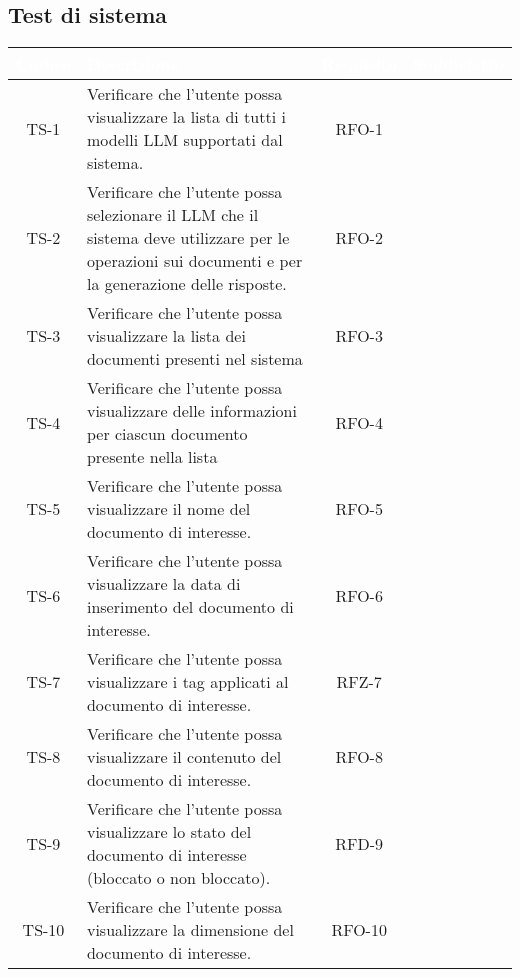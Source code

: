 \newpage
\subsection{Test di sistema}

\begingroup
\setlength{\tabcolsep}{10pt}
\renewcommand{\arraystretch}{1.5}
\begin{xltabular}{\textwidth}{| c | X | c | c |}
    \hline
     \textbf{\textcolor{white}{Codice}} & \textbf{\textcolor{white}{Descrizione}} & \textbf{\textcolor{white}{Requisito}} & \textbf{\textcolor{white}{Soddisfatto}}\\
    \hline
    \endhead
    TS-1 & Verificare che l’utente possa visualizzare la lista di tutti i modelli LLM supportati dal sistema. & RFO-1 & \textcolor{cmarkcolor}{} \\
    \hline
    TS-2 & Verificare che l’utente possa selezionare il LLM che il sistema deve utilizzare per le operazioni sui documenti e per la generazione delle risposte. & RFO-2 & \textcolor{cmarkcolor}{} \\
    \hline
    TS-3 & Verificare che l'utente possa visualizzare la lista dei documenti presenti nel sistema & RFO-3 & \textcolor{cmarkcolor}{} \\
    \hline
    TS-4 & Verificare che l'utente possa visualizzare delle informazioni per ciascun documento presente nella lista & RFO-4 & \textcolor{cmarkcolor}{} \\
    \hline
    TS-5 & Verificare che l’utente possa visualizzare il nome del documento di interesse. & RFO-5 & \textcolor{cmarkcolor}{} \\
    \hline
    TS-6 & Verificare che l’utente possa visualizzare la data di inserimento del documento di interesse. & RFO-6 & \textcolor{cmarkcolor}{} \\
    \hline
    TS-7 & Verificare che l’utente possa visualizzare i tag applicati al documento di interesse. & RFZ-7 & \textcolor{cmarkcolor}{} \\
    \hline
    TS-8 & Verificare che l’utente possa visualizzare il contenuto del documento di interesse. & RFO-8 & \textcolor{cmarkcolor}{} \\
    \hline
    TS-9 & Verificare che l’utente possa visualizzare lo stato del documento di interesse (bloccato o non bloccato). & RFD-9 & \textcolor{cmarkcolor}{}\\
    \hline
    TS-10 &  Verificare che l’utente possa visualizzare la dimensione del documento di interesse. & RFO-10 & \textcolor{cmarkcolor}{} \\

\end{xltabular}

